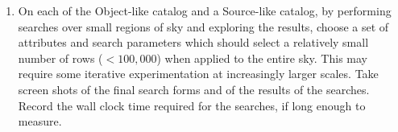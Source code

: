 \begin{enumerate}
{\begin{enumerate}
{ Take screen shots of the search forms and of the results of the searches.
 Record the wall clock time required for the searches, if long enough to measure.}
      \item{On each of the Object-like catalog and a Source-like catalog, by performing searches over small regions of sky and exploring the results, choose a set of attributes and search parameters which should select a relatively small number of rows ($<100,000$) when applied to the entire sky.
 This may require some iterative experimentation at increasingly larger scales.
 Take screen shots of the final search forms and of the results of the searches.
 Record the wall clock time required for the searches, if long enough to measure.}
    \end{enumerate}
  }

\end{enumerate}
